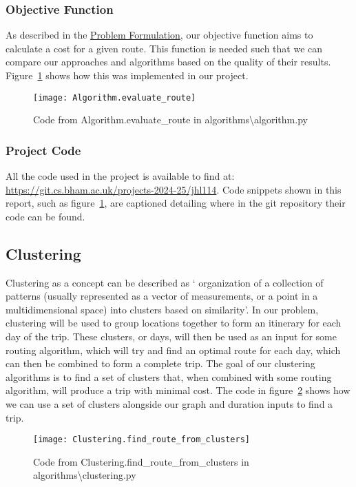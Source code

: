 \subsubsection{Objective Function}\label{subsubsec:algorithms-objective-function}
As described in the \hyperref[sec:problem-formulation]{Problem Formulation}, our objective function aims to
calculate a cost for a given route.
This function is needed such that we can compare our approaches and algorithms based on the quality of their results.
Figure~\ref{fig:Algorithm.evaluate_route} shows how this was implemented in our project.
\begin{figure}[H]
    \centering
    \texttt{[image: Algorithm.evaluate\_route]}
    \caption{Code from Algorithm.evaluate\_route in algorithms\textbackslash algorithm.py}
    \label{fig:Algorithm.evaluate_route}
\end{figure}

\subsubsection{Project Code}\label{subsubsec:project-code}
All the code used in the project is available to find at: \url{https://git.cs.bham.ac.uk/projects-2024-25/jhl114}.
Code snippets shown in this report, such as figure~\ref{fig:Algorithm.evaluate_route}, are captioned
detailing where in the git repository their code can be found.

\subsection{Clustering}\label{subsec:clustering}
Clustering as a concept can be described as `
organization of a collection of patterns (usually represented as a vector of measurements, or a point in a multidimensional
space) into clusters based on similarity'\parencite[p. 265]{jain1999data}.
In our problem, clustering will be used to group locations together to form an itinerary for each day of the trip.
These clusters, or days, will then be used as an input for some routing algorithm, which will try and find an
optimal route for each day, which can then be combined to form a complete trip.
The goal of our clustering algorithms is to find a set of clusters that, when combined with some routing algorithm,
will produce a trip with minimal cost.
The code in figure~\ref{fig:Clustering.find_route_from_clusters} shows how we can use a set of clusters alongside our
graph and duration inputs to find a trip.
\begin{figure}[H]
    \centering
    \texttt{[image: Clustering.find\_route\_from\_clusters]}
    \caption{Code from Clustering.find\_route\_from\_clusters in algorithms\textbackslash clustering.py}
    \label{fig:Clustering.find_route_from_clusters}
\end{figure}

